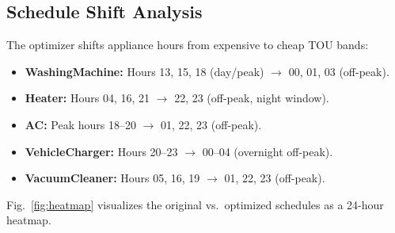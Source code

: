 \documentclass[10pt,a4paper,twocolumn]{article}
\begin{document}
\subsection{Schedule Shift Analysis}
The optimizer shifts appliance hours from expensive to cheap TOU bands:
\begin{itemize}
    \item \textbf{WashingMachine:} Hours 13, 15, 18 (day/peak) $\rightarrow$ 00, 01, 03 (off-peak).
    \item \textbf{Heater:} Hours 04, 16, 21 $\rightarrow$ 22, 23 (off-peak, night window).
    \item \textbf{AC:} Peak hours 18--20 $\rightarrow$ 01, 22, 23 (off-peak).
    \item \textbf{VehicleCharger:} Hours 20--23 $\rightarrow$ 00--04 (overnight off-peak).
    \item \textbf{VacuumCleaner:} Hours 05, 16, 19 $\rightarrow$ 01, 22, 23 (off-peak).
\end{itemize}

Fig.~\ref{fig:heatmap} visualizes the original vs.\ optimized schedules as a 24-hour heatmap.
\end{document}
